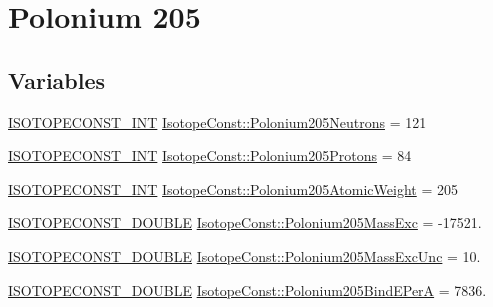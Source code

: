 \hypertarget{group___isotope_const-_polonium-_po205}{}\section{Polonium 205}
\label{group___isotope_const-_polonium-_po205}
\subsection*{Variables}
\begin{DoxyCompactItemize}
\item 
\mbox{\hyperlink{group___isotope_const-_macros_ga5f18360b3e99483a35c32d789e62621c}{I\+S\+O\+T\+O\+P\+E\+C\+O\+N\+S\+T\+\_\+\+I\+NT}} \mbox{\hyperlink{group___isotope_const-_polonium-_po205_gaff3d5beacfd909cbc6be30841a01f6a0}{Isotope\+Const\+::\+Polonium205\+Neutrons}} = 121
\item 
\mbox{\hyperlink{group___isotope_const-_macros_ga5f18360b3e99483a35c32d789e62621c}{I\+S\+O\+T\+O\+P\+E\+C\+O\+N\+S\+T\+\_\+\+I\+NT}} \mbox{\hyperlink{group___isotope_const-_polonium-_po205_ga9b2cd17778d8375b2ac9630536035e9d}{Isotope\+Const\+::\+Polonium205\+Protons}} = 84
\item 
\mbox{\hyperlink{group___isotope_const-_macros_ga5f18360b3e99483a35c32d789e62621c}{I\+S\+O\+T\+O\+P\+E\+C\+O\+N\+S\+T\+\_\+\+I\+NT}} \mbox{\hyperlink{group___isotope_const-_polonium-_po205_gad2fb6b27b0e64f742c9cf2aaf1717653}{Isotope\+Const\+::\+Polonium205\+Atomic\+Weight}} = 205
\item 
\mbox{\hyperlink{group___isotope_const-_macros_ga8f45a7272ce02c0b4c65c44636ed719a}{I\+S\+O\+T\+O\+P\+E\+C\+O\+N\+S\+T\+\_\+\+D\+O\+U\+B\+LE}} \mbox{\hyperlink{group___isotope_const-_polonium-_po205_ga86f02e028813e633bfa20f85a3f6dea0}{Isotope\+Const\+::\+Polonium205\+Mass\+Exc}} = -\/17521.
\item 
\mbox{\hyperlink{group___isotope_const-_macros_ga8f45a7272ce02c0b4c65c44636ed719a}{I\+S\+O\+T\+O\+P\+E\+C\+O\+N\+S\+T\+\_\+\+D\+O\+U\+B\+LE}} \mbox{\hyperlink{group___isotope_const-_polonium-_po205_ga8015c3a716d856a6403ff79e87ab8c8f}{Isotope\+Const\+::\+Polonium205\+Mass\+Exc\+Unc}} = 10.
\item 
\mbox{\hyperlink{group___isotope_const-_macros_ga8f45a7272ce02c0b4c65c44636ed719a}{I\+S\+O\+T\+O\+P\+E\+C\+O\+N\+S\+T\+\_\+\+D\+O\+U\+B\+LE}} \mbox{\hyperlink{group___isotope_const-_polonium-_po205_ga0c73b4948d17af4c68834f2197955d7b}{Isotope\+Const\+::\+Polonium205\+Bind\+E\+PerA}} = 7836.
\item 

\end{DoxyCompactItemize}
